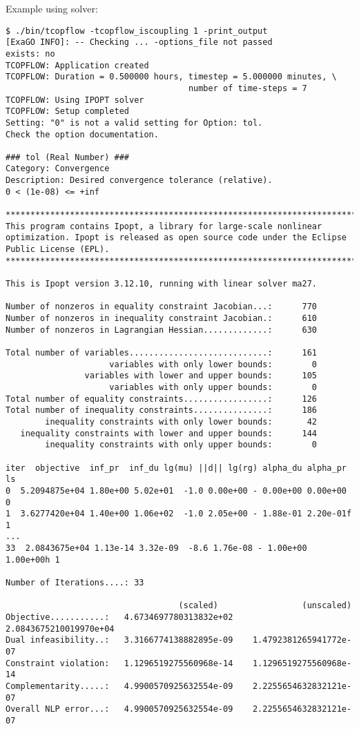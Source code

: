 Example using \ipopt solver:

\begin{lstlisting}
$ ./bin/tcopflow -tcopflow_iscoupling 1 -print_output
[ExaGO INFO]: -- Checking ... -options_file not passed             exists: no
TCOPFLOW: Application created
TCOPFLOW: Duration = 0.500000 hours, timestep = 5.000000 minutes, \
                                     number of time-steps = 7
TCOPFLOW: Using IPOPT solver
TCOPFLOW: Setup completed
Setting: "0" is not a valid setting for Option: tol. 
Check the option documentation.

### tol (Real Number) ###
Category: Convergence
Description: Desired convergence tolerance (relative).
0 < (1e-08) <= +inf

*************************************************************************
This program contains Ipopt, a library for large-scale nonlinear 
optimization. Ipopt is released as open source code under the Eclipse 
Public License (EPL).
*************************************************************************

This is Ipopt version 3.12.10, running with linear solver ma27.

Number of nonzeros in equality constraint Jacobian...:      770
Number of nonzeros in inequality constraint Jacobian.:      610
Number of nonzeros in Lagrangian Hessian.............:      630

Total number of variables............................:      161
                     variables with only lower bounds:        0
                variables with lower and upper bounds:      105
                     variables with only upper bounds:        0
Total number of equality constraints.................:      126
Total number of inequality constraints...............:      186
        inequality constraints with only lower bounds:       42
   inequality constraints with lower and upper bounds:      144
        inequality constraints with only upper bounds:        0

iter  objective  inf_pr  inf_du lg(mu) ||d|| lg(rg) alpha_du alpha_pr  ls
0  5.2094875e+04 1.80e+00 5.02e+01  -1.0 0.00e+00 - 0.00e+00 0.00e+00   0
1  3.6277420e+04 1.40e+00 1.06e+02  -1.0 2.05e+00 - 1.88e-01 2.20e-01f  1
...
33  2.0843675e+04 1.13e-14 3.32e-09  -8.6 1.76e-08 - 1.00e+00 1.00e+00h 1

Number of Iterations....: 33

                                   (scaled)                 (unscaled)
Objective...........:   4.6734697780313832e+02    2.0843675210019970e+04
Dual infeasibility..:   3.3166774138882895e-09    1.4792381265941772e-07
Constraint violation:   1.1296519275560968e-14    1.1296519275560968e-14
Complementarity.....:   4.9900570925632554e-09    2.2255654632832121e-07
Overall NLP error...:   4.9900570925632554e-09    2.2255654632832121e-07



\end{lstlisting}
